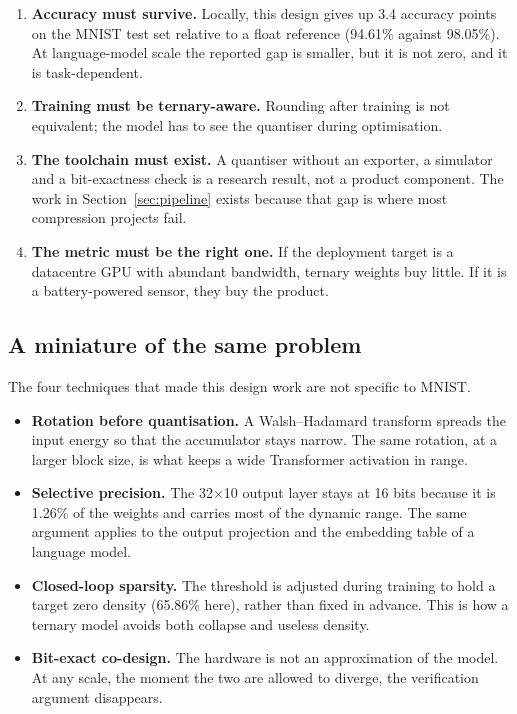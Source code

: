 \documentclass[11pt,a4paper]{article}
\begin{document}
\begin{enumerate}[leftmargin=*]
  \item \textbf{Accuracy must survive.} Locally, this design gives up 3.4
    accuracy points on the MNIST test set relative to a float reference
    (94.61\% against 98.05\%). At language-model scale the reported gap is
    smaller, but it is not zero, and it is task-dependent.
  \item \textbf{Training must be ternary-aware.} Rounding after training is
    not equivalent; the model has to see the quantiser during optimisation.
  \item \textbf{The toolchain must exist.} A quantiser without an exporter, a
    simulator and a bit-exactness check is a research result, not a product
    component. The work in Section~\ref{sec:pipeline} exists because that gap
    is where most compression projects fail.
  \item \textbf{The metric must be the right one.} If the deployment target is a
    datacentre GPU with abundant bandwidth, ternary weights buy little. If it is
    a battery-powered sensor, they buy the product.
\end{enumerate}

\subsection{A miniature of the same problem}

The four techniques that made this design work are not specific to MNIST.

\begin{itemize}[leftmargin=*]
  \item \textbf{Rotation before quantisation.} A Walsh--Hadamard transform
    spreads the input energy so that the accumulator stays narrow. The same
    rotation, at a larger block size, is what keeps a wide Transformer
    activation in range.
  \item \textbf{Selective precision.} The 32$\times$10 output layer stays at 16
    bits because it is 1.26\% of the weights and carries most of the dynamic
    range. The same argument applies to the output projection and the embedding
    table of a language model.
  \item \textbf{Closed-loop sparsity.} The threshold is adjusted during training
    to hold a target zero density (65.86\% here), rather than fixed in advance.
    This is how a ternary model avoids both collapse and useless density.
  \item \textbf{Bit-exact co-design.} The hardware is not an approximation of
    the model. At any scale, the moment the two are allowed to diverge, the
    verification argument disappears.
\end{itemize}
\end{document}
